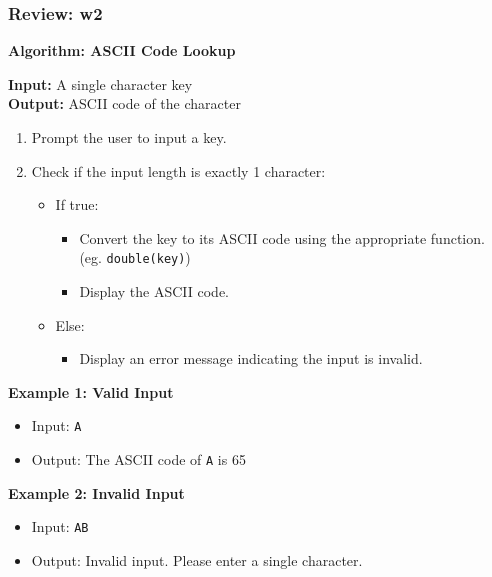 \documentclass[
	11pt, %
]{beamer}
\begin{document}
\begin{frame}
	\frametitle{Review: w2}

	\textbf{Algorithm: ASCII Code Lookup}

\textbf{Input:} A single character key \\
\textbf{Output:} ASCII code of the character

\begin{enumerate}
    \item Prompt the user to input a key.
    \item Check if the input length is exactly 1 character:
    \begin{itemize}
        \item If true:
        \begin{itemize}
            \item Convert the key to its ASCII code using the appropriate function. (eg. \texttt{double(key)})
            \item Display the ASCII code.
        \end{itemize}
        \item Else:
        \begin{itemize}
            \item Display an error message indicating the input is invalid.
        \end{itemize}
    \end{itemize}
\end{enumerate}

\textbf{Example 1: Valid Input}
\begin{itemize}
    \item Input: \texttt{A}
    \item Output: The ASCII code of \texttt{A} is 65
\end{itemize}

\textbf{Example 2: Invalid Input}
\begin{itemize}
    \item Input: \texttt{AB}
    \item Output: Invalid input. Please enter a single character.
\end{itemize}

\end{frame}

\end{document}
